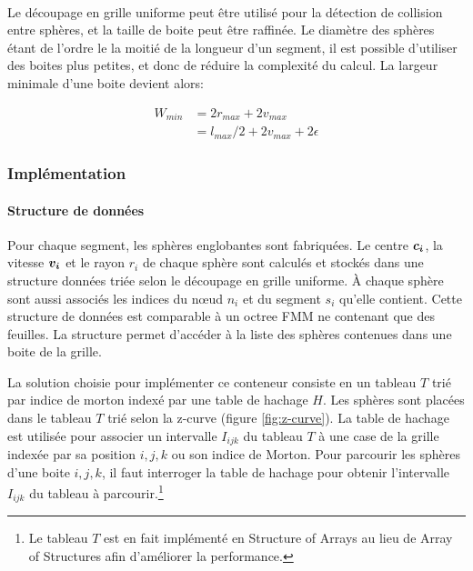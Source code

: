 \documentclass[11pt,class=article,float=false,crop=false]{standalone}
\begin{document}
\paragraph{}
Le découpage en grille uniforme peut être utilisé pour la détection de collision entre sphères, et la taille de boite peut être raffinée. Le diamètre des sphères étant de l'ordre le la moitié de la longueur d'un segment, il est possible d'utiliser des boites plus petites, et donc de réduire la complexité du calcul. La largeur minimale d'une boite devient alors:

\begin{equation}
\begin{split}
W_{min} &= 2r_{max} + 2v_{max} \\
	    &= l_{max}/2 + 2v_{max} + 2\epsilon
\end{split}
\end{equation}



\subsubsection{Implémentation}

\paragraph{Structure de données}
Pour chaque segment, les sphères englobantes sont fabriquées. Le centre $\bm{c_i}$, la vitesse $\bm{v_i}$ et le rayon $r_i$ de chaque sphère sont calculés et stockés dans une structure données triée selon le découpage en grille uniforme. \`A chaque sphère sont aussi associés les indices du nœud $n_i$ et du segment $s_i$ qu'elle contient. Cette structure de données est comparable à un octree FMM ne contenant que des feuilles. La structure permet d'accéder à la liste des sphères contenues dans une boite de la grille.

La solution choisie pour implémenter ce conteneur consiste en un tableau $T$ trié par indice de morton indexé par une table de hachage $H$. Les sphères sont placées dans le tableau $T$ trié selon la z-curve (figure \ref{fig:z-curve}). La table de hachage est utilisée pour associer un intervalle $I_{ijk}$ du tableau $T$ à une case de la grille indexée par sa position ${i,j,k}$ ou son indice de Morton. Pour parcourir les sphères d'une boite ${i,j,k}$, il faut interroger la table de hachage pour obtenir l'intervalle $I_{ijk}$ du tableau à parcourir.\footnote{ Le tableau $T$ est en fait implémenté en Structure of Arrays au lieu de Array of Structures afin d'améliorer la performance.}	
\end{document}
